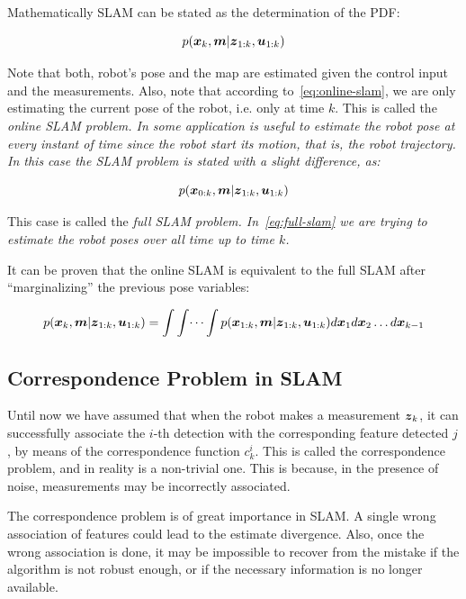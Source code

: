 Mathematically SLAM can be stated as the determination of the PDF:

\begin{equation}
p(\boldsymbol{x}_k,\boldsymbol{m}|\boldsymbol{z}_{1:k},\boldsymbol{u}_{1:k})
\label{eq:online-slam}
\end{equation} 

\noindent
Note that both, robot's pose and the map are estimated given the control input and the measurements. Also, note that according to~\eqref{eq:online-slam}, we are only estimating the current pose of the robot, i.e. only at time $k$. This is called the \it{online SLAM} problem. In some application is useful to estimate the robot pose at every instant of time since the robot start its motion, that is, the robot trajectory. In this case the SLAM problem is stated with a slight difference, as:

\begin{equation}
p(\boldsymbol{x}_{0:k},\boldsymbol{m}|\boldsymbol{z}_{1:k},\boldsymbol{u}_{1:k})
\label{eq:full-slam}
\end{equation} 

This case is called the \it{full SLAM} problem. In~\eqref{eq:full-slam} we are trying to estimate the robot poses over all time up to time $k$. 

It can be proven that the online SLAM is equivalent to the full SLAM after ``marginalizing'' the previous pose variables:

\begin{equation}
p(\boldsymbol{x}_k,\boldsymbol{m}|\boldsymbol{z}_{1:k},\boldsymbol{u}_{1:k}) = \int \int \dots \int 
p(\boldsymbol{x}_{1:k},\boldsymbol{m}|\boldsymbol{z}_{1:k},\boldsymbol{u}_{1:k}) d\boldsymbol{x}_1 d\boldsymbol{x}_2 \dots d\boldsymbol{x}_{k-1}
\end{equation}

\subsection{Correspondence Problem in SLAM}

Until now we have assumed that when the robot makes a measurement $\boldsymbol{z}_k$, it can successfully associate the $i$-th detection with the corresponding feature detected $j$, by means of the correspondence function $c_k^i$. This is called the correspondence problem, and in reality is a non-trivial one. This is because, in the presence of noise, measurements may be incorrectly associated. 

The correspondence problem is of great importance in SLAM. A single wrong association of features could lead to the estimate divergence. Also, once the wrong association is done, it may be impossible to recover from the mistake if the algorithm is not robust enough, or if the necessary information is no longer available.

